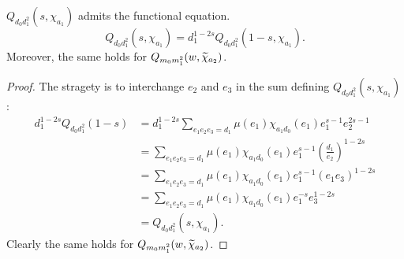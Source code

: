 \documentclass[12pt,reqno,oneside]{amsart}
\begin{document}
    \begin{theorem}\label{thm:functional_equation_correction_polynomials}
        $Q_{d_{0}d_{1}^{2}}(s,\chi_{a_{1}})$ admits the functional equation.
        \[
            Q_{d_{0}d_{1}^{2}}(s,\chi_{a_{1}}) = d_{1}^{1-2s}Q_{d_{0}d_{1}^{2}}(1-s,\chi_{a_{1}}).
        \]
        Moreover, the same holds for $Q_{m_{0}m_{1}^{2}}(w,\widetilde{\chi}_{a_{2}})$.
    \end{theorem}
    \begin{proof}
        The stragety is to interchange $e_{2}$ and $e_{3}$ in the sum defining $Q_{d_{0}d_{1}^{2}}(s,\chi_{a_{1}})$:
        \begin{align*}
            d_{1}^{1-2s}Q_{d_{0}d_{1}^{2}}(1-s) &= d_{1}^{1-2s}\sum_{e_{1}e_{2}e_{3} = d_{1}}\mu(e_{1})\chi_{a_{1}d_{0}}(e_{1})e_{1}^{s-1}e_{2}^{2s-1} \\
            &= \sum_{e_{1}e_{2}e_{3} = d_{1}}\mu(e_{1})\chi_{a_{1}d_{0}}(e_{1})e_{1}^{s-1}\left(\frac{d_{1}}{e_{2}}\right)^{1-2s} \\
            &= \sum_{e_{1}e_{2}e_{3} = d_{1}}\mu(e_{1})\chi_{a_{1}d_{0}}(e_{1})e_{1}^{s-1}(e_{1}e_{3})^{1-2s} \\
            &= \sum_{e_{1}e_{2}e_{3} = d_{1}}\mu(e_{1})\chi_{a_{1}d_{0}}(e_{1})e_{1}^{-s}e_{3}^{1-2s} \\
            &= Q_{d_{0}d_{1}^{2}}(s,\chi_{a_{1}}).
        \end{align*}
        Clearly the same holds for $Q_{m_{0}m_{1}^{2}}(w,\widetilde{\chi}_{a_{2}})$.
    \end{proof}
\end{document}
